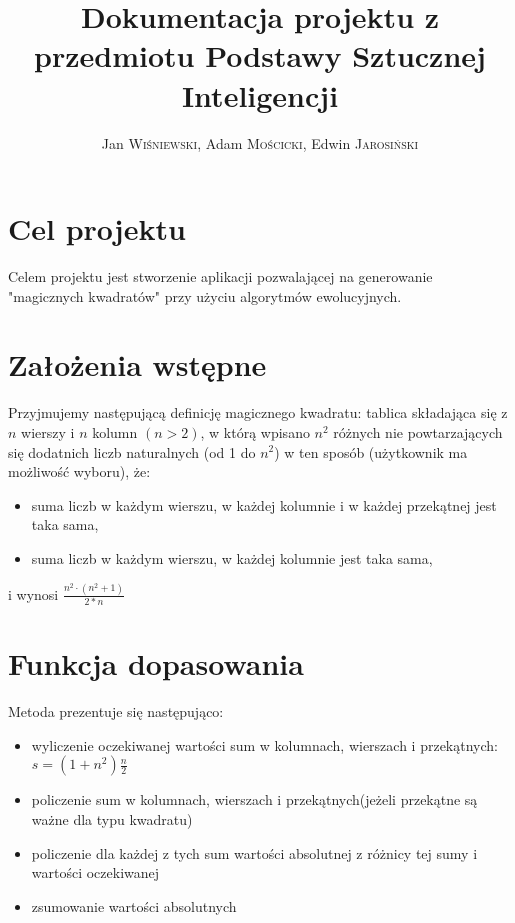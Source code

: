 \documentclass[a4paper,twoside,10pt]{article}
\author{Jan \textsc{Wiśniewski}, Adam \textsc{Mościcki}, Edwin \textsc{Jarosiński}}
\title{Dokumentacja projektu z przedmiotu Podstawy Sztucznej Inteligencji}
\begin{document}
\maketitle
 
\section{Cel projektu}
	Celem projektu jest stworzenie aplikacji pozwalającej na generowanie "magicznych kwadratów" przy użyciu algorytmów ewolucyjnych.
\section{Założenia wstępne}
	Przyjmujemy następującą definicję magicznego kwadratu:
 tablica składająca się z $ n $ wierszy i $ n $ kolumn $ (n>2) $, w którą wpisano $ n^2 $ różnych nie powtarzających się dodatnich liczb naturalnych (od 1 do $n^2$) w ten sposób (użytkownik ma możliwość wyboru), że:
 \begin{itemize}
  \item suma liczb w każdym wierszu, w każdej kolumnie i w każdej przekątnej jest taka sama,
  \item suma liczb w każdym wierszu, w każdej kolumnie jest taka sama,
 \end{itemize}
 i wynosi $\frac{n^2\cdot(n^2+1)}{2*n}$
\section{Funkcja dopasowania}
Metoda prezentuje się następująco:
		\begin{itemize}
		\item wyliczenie oczekiwanej wartości sum w kolumnach, wierszach i przekątnych: $ s = (1 + n^2) \frac{n}{2} $
		\item policzenie sum w kolumnach, wierszach i przekątnych(jeżeli przekątne są ważne dla typu kwadratu)
		\item policzenie dla każdej z tych sum wartości absolutnej z różnicy tej sumy i wartości oczekiwanej
		\item zsumowanie wartości absolutnych
	\end{itemize}
\end{document}
